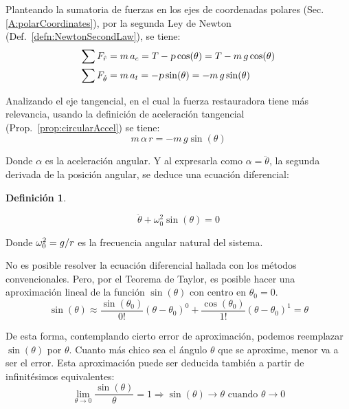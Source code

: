 \documentclass[a5paper,12pt,twoside]{book}
\newtheorem{defn}{{Definición}}[chapter]
\begin{document}
\begin{center}
    \def\svgwidth{\linewidth}
    
\end{center}

Planteando la sumatoria de fuerzas en los ejes de coordenadas polares (Sec. \ref{A:polarCoordinates}), por la segunda Ley de Newton (Def.\ \ref{defn:NewtonSecondLaw}), se tiene:
\begin{align*}
    \sum F_{\hat{r}} &= m \, a_c = T - \textsl{p} \cos(\theta) = T - m \, g \cos(\theta)
    \\
    \sum F_{\hat{\theta}} &= m \, a_t = - \textsl{p} \sin(\theta) = - m \, g \sin(\theta)
\end{align*}

Analizando el eje tangencial, en el cual la fuerza restauradora tiene más relevancia, usando la definición de aceleración tangencial (Prop.\ \ref{prop:circularAccel}) se tiene:
\[ m \, \alpha \, r = - m \, g \sin(\theta) \]

Donde $\alpha$ es la aceleración angular.
Y al expresarla como $\alpha = \ddot{\theta}$, la segunda derivada de la posición angular, se deduce una ecuación diferencial:

\begin{mdframed}[style=MyFrame1]
    \begin{defn}
    \end{defn}
    \begin{equation*}
        \ddot{\theta} + \omega_0^2 \sin(\theta) = 0
    \end{equation*}
\end{mdframed}

Donde $\omega_0^2=g/r$ es la frecuencia angular natural del sistema.

No es posible resolver la ecuación diferencial hallada con los métodos convencionales.
Pero, por el Teorema de Taylor, es posible hacer una aproximación lineal de la función $\sin{(\theta)}$ con centro en $\theta_0 = 0$.
\[
  \sin(\theta) \approx \frac{\sin(\theta_0)}{0!} \left( \theta-\theta_0 \right)^0 + \frac{\cos(\theta_0)}{1!} \left( \theta-\theta_0 \right)^1 = \theta
\]

De esta forma, contemplando cierto error de aproximación, podemos reemplazar $\sin{(\theta)}$ por $\theta$.
Cuanto más chico sea el ángulo $\theta$ que se aproxime, menor va a ser el error.
Esta aproximación puede ser deducida también a partir de infinitésimos equivalentes:
\[
  \lim_{\theta \to 0} \frac{\sin(\theta)}{\theta} = 1 \Rightarrow \sin(\theta) \to \theta \text{ cuando } \theta \to 0
\]
\end{document}
